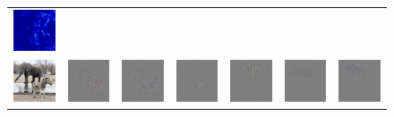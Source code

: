 \begin{figure}
\begin{center}
\begin{tabular}{ccccccc}
\includegraphics[width=0.14\linewidth,height=0.115\linewidth]{figs/examples/googlenet/soft/zeb-ele1_sali_387} \\
\vspace{-2.5pt}
\includegraphics[width=0.14\linewidth,height=0.115\linewidth]{figs/examples/googlenet/soft/zeb-ele2} &
\includegraphics[width=0.14\linewidth,height=0.115\linewidth]{figs/examples/alexnet/soft/zeb-ele2_diff_341} &
\includegraphics[width=0.14\linewidth,height=0.115\linewidth]{figs/examples/vggnet/soft/zeb-ele2_diff_341} &
\includegraphics[width=0.14\linewidth,height=0.115\linewidth]{figs/examples/googlenet/soft/zeb-ele2_diff_341} &
\includegraphics[width=0.14\linewidth,height=0.115\linewidth]{figs/examples/alexnet/soft/zeb-ele2_diff_387} &
\includegraphics[width=0.14\linewidth,height=0.115\linewidth]{figs/examples/vggnet/soft/zeb-ele2_diff_387} &
\includegraphics[width=0.14\linewidth,height=0.115\linewidth]{figs/examples/googlenet/soft/zeb-ele2_diff_387} \\

\end{tabular}
\end{center}
\end{figure}
